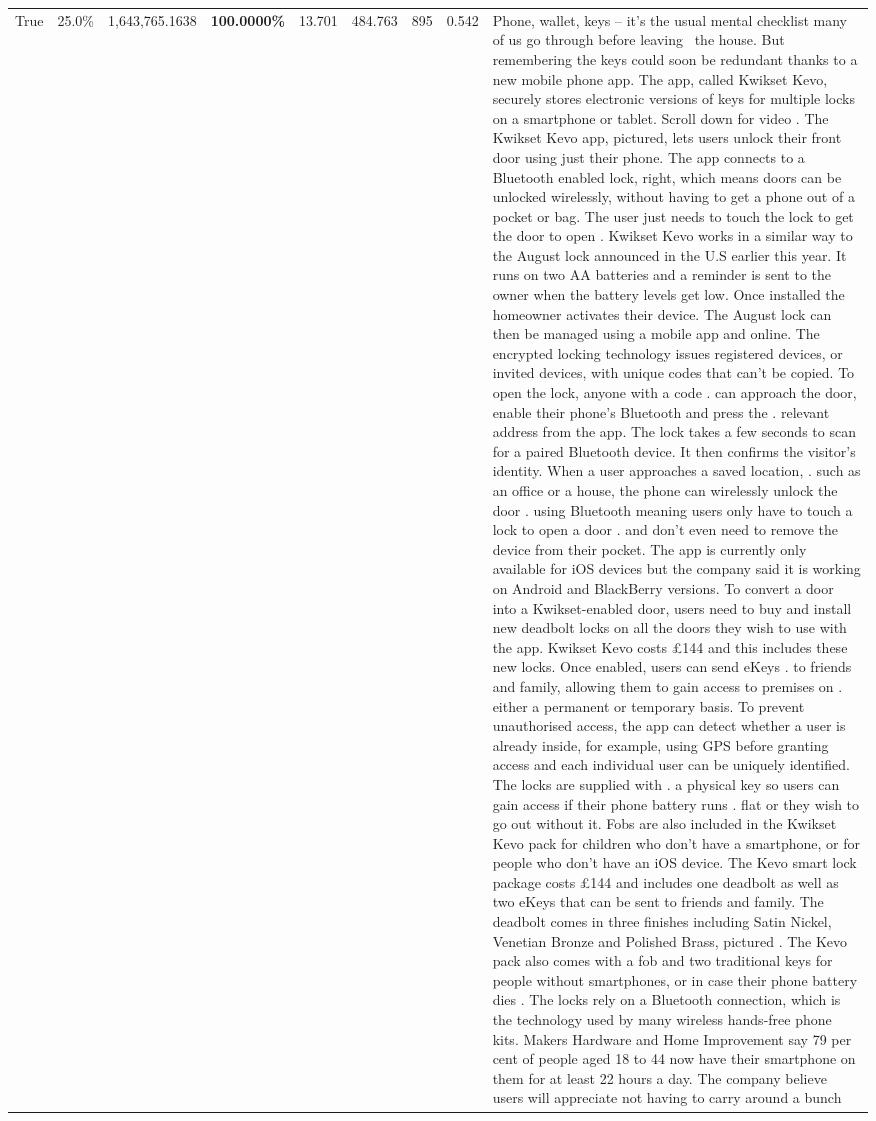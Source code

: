 \begin{table}[H]
\begin{tabular}{lllrlllll}
True & 25.0\% & 1,643,765.1638 & \bfseries \color{red} 100.0000\% & 13.701 & 484.763 & 895 & 0.542 & Phone, wallet, keys – it’s the usual mental checklist many of us go through before leaving  the house. But remembering the keys could soon be redundant thanks to a new mobile phone app. The app, called Kwikset Kevo, securely stores electronic versions of keys for multiple locks on a smartphone or tablet. Scroll down for video . The Kwikset Kevo app, pictured, lets users unlock their front door using just their phone. The app connects to a Bluetooth enabled lock, right, which means doors can be unlocked wirelessly, without having to get a phone out of a pocket or bag. The user just needs to touch the lock to get the door to open . Kwikset Kevo works in a similar way to the August lock announced in the U.S earlier this year. It runs on two AA batteries and a reminder is sent to the owner when the battery levels get low. Once installed the homeowner activates their device. The August lock can then be managed using a mobile app and online. The encrypted locking technology issues registered devices, or invited devices, with unique codes that can't be copied. To open the lock, anyone with a code . can approach the door, enable their phone's Bluetooth and press the . relevant address from the app. The lock takes a few seconds to scan for a paired Bluetooth device. It then confirms the visitor's identity. When a user approaches a saved location, . such as an office or a house, the phone can wirelessly unlock the door . using Bluetooth meaning users only have to touch a lock to open a door . and don't even need to remove the device from their pocket. The app is currently only available for iOS devices but the company said it is working on Android and BlackBerry versions. To convert a door into a Kwikset-enabled door, users need to buy and install new deadbolt locks on all the doors they wish to use with the app. Kwikset Kevo costs £144 and this includes these new locks. Once enabled, users can send eKeys . to friends and family, allowing them to gain access to premises on . either a permanent or temporary basis. To prevent unauthorised access, the app can detect whether a user is already inside, for example, using GPS before granting access and each individual user can be uniquely identified. The locks are supplied with . a physical key so users can gain access if their phone battery runs . flat or they wish to go out without it. Fobs are also included in the Kwikset Kevo pack for children who don't have a smartphone, or for people who don't have an iOS device. The Kevo smart lock package costs £144 and includes one deadbolt as well as two eKeys that can be sent to friends and family. The deadbolt comes in three finishes including Satin Nickel, Venetian Bronze and Polished Brass, pictured . The Kevo pack also comes with a fob and two traditional keys for people without smartphones, or in case their phone battery dies . The locks rely on a Bluetooth connection, which is the technology used by many wireless hands-free phone kits. Makers Hardware and Home Improvement say 79 per cent of people aged 18 to 44 now have their smartphone on them for at least 22 hours a day. The company believe users will appreciate not having to carry around a bunch 
\end{tabular}
\end{table}
